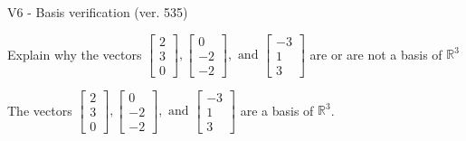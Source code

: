 \begin{exercise}
  \begin{exerciseTitle}V6 - Basis verification (ver. 535)\end{exerciseTitle}
  \begin{exerciseStatement}
    Explain why the vectors \(\left[\begin{array}{r}
2 \\
3 \\
0
\end{array}\right] , \left[\begin{array}{r}
0 \\
-2 \\
-2
\end{array}\right] , \text{ and } \left[\begin{array}{r}
-3 \\
1 \\
3
\end{array}\right]\) are or are not a basis of \(\mathbb{R}^3\)	


  \end{exerciseStatement}
  \begin{exerciseAnswer}
   The vectors \(\left[\begin{array}{r}
2 \\
3 \\
0
\end{array}\right] , \left[\begin{array}{r}
0 \\
-2 \\
-2
\end{array}\right] , \text{ and } \left[\begin{array}{r}
-3 \\
1 \\
3
\end{array}\right]\) 
  	 are  a basis of \(\mathbb{R}^3\).
  


  \end{exerciseAnswer}
\end{exercise}